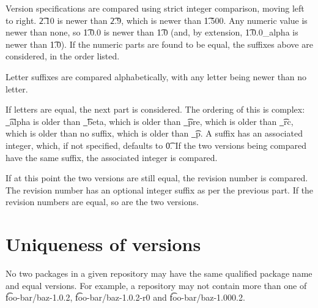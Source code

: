 Version specifications are compared using strict integer comparison, moving left to right. \t{2.10}
is newer than \t{2.9}, which is newer than \t{1.500}. Any numeric value is newer than none, so
\t{1.0.0} is newer than \t{1.0} (and, by extension, \t{1.0.0\_alpha} is newer than \t{1.0}).
If the numeric parts are found to be equal, the suffixes above are considered, in the order listed.

Letter suffixes are compared alphabetically, with any letter being newer than no letter.

If letters are equal, the next part is considered. The ordering of this is complex: \t{\_alpha} is
older than \t{\_beta}, which is older than \t{\_pre}, which is older than \t{\_rc}, which is older
than no suffix, which is older than \t{\_p}. A suffix has an associated integer, which, if not
specified, defaults to \t{0}. If the two versions being compared have the same suffix, the
associated integer is compared.

If at this point the two versions are still equal, the revision number is compared. The revision
number has an optional integer suffix as per the previous part. If the revision numbers are equal,
so are the two versions.


\section{Uniqueness of versions}

No two packages in a given repository may have the same qualified package name and equal versions.
For example, a repository may not contain more than one of \t{foo-bar/baz-1.0.2},
\t{foo-bar/baz-1.0.2-r0} and \t{foo-bar/baz-1.000.2}.

